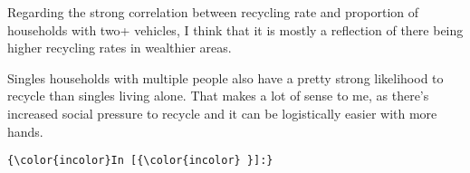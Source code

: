 \documentclass[11pt]{article}
\begin{document}
Regarding the strong correlation between recycling rate and proportion
of households with two+ vehicles, I think that it is mostly a reflection
of there being higher recycling rates in wealthier areas.

Singles households with multiple people also have a pretty strong
likelihood to recycle than singles living alone. That makes a lot of
sense to me, as there's increased social pressure to recycle and it can
be logistically easier with more hands.

    \begin{Verbatim}[commandchars=\\\{\}]
{\color{incolor}In [{\color{incolor} }]:} 
\end{Verbatim}


    
    
    
    
\end{document}
